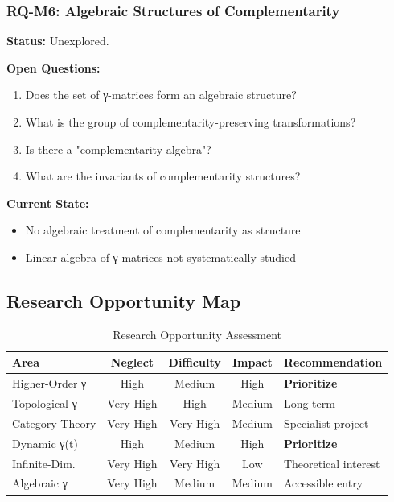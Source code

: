 \subsubsection{RQ-M6: Algebraic Structures of Complementarity}

\textbf{Status:} Unexplored.

\textbf{Open Questions:}
\begin{enumerate}[noitemsep]
    \item Does the set of γ-matrices form an algebraic structure?
    \item What is the group of complementarity-preserving transformations?
    \item Is there a "complementarity algebra"?
    \item What are the invariants of complementarity structures?
\end{enumerate}

\textbf{Current State:}
\begin{itemize}[noitemsep]
    \item No algebraic treatment of complementarity as structure
    \item Linear algebra of γ-matrices not systematically studied
\end{itemize}

\subsection{Research Opportunity Map}

\begin{table}[h]
\centering
\caption{Research Opportunity Assessment}
\label{tab:opportunity}
\renewcommand{\arraystretch}{1.3}
\small
\begin{tabular}{@{}lcccl@{}}
\toprule
\textbf{Area} & \textbf{Neglect} & \textbf{Difficulty} & \textbf{Impact} & \textbf{Recommendation} \\
\midrule
Higher-Order γ & High & Medium & High & \textbf{Prioritize} \\
Topological γ & Very High & High & Medium & Long-term \\
Category Theory & Very High & Very High & Medium & Specialist project \\
Dynamic γ(t) & High & Medium & High & \textbf{Prioritize} \\
Infinite-Dim. & Very High & Very High & Low & Theoretical interest \\
Algebraic γ & Very High & Medium & Medium & Accessible entry \\
\bottomrule
\end{tabular}
\end{table}

